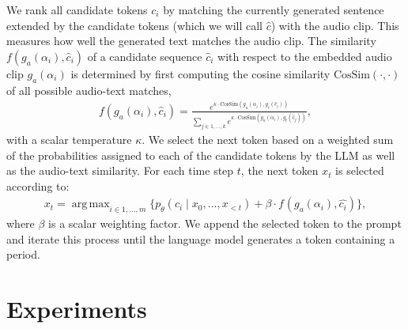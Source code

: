 \documentclass{article}
\DeclareMathOperator*{\argmax}{arg\,max}
\begin{document}
We rank all candidate tokens $c_i$ by matching the currently generated sentence extended by the candidate tokens (which we will call $\hat{c}$) with the audio clip. This measures how well the generated text matches the audio clip.
The similarity $f(g_a(\alpha_i),\hat{c}_i)$ of a candidate sequence $\hat{c}_i$ with respect to the embedded audio clip $g_a(\alpha_i)$ is determined by first computing the cosine similarity $\text{CosSim}(\cdot,\cdot)$ of all possible audio-text matches,
\begin{equation}
    \begin{split}
        f(g_a(\alpha_i),\hat{c}_i)
        =
        \frac{
        e^{\kappa \cdot \text{CosSim} \left(g_a(\alpha_i), g_t(\hat{c}_i) \right)}
        }{
        \sum_{j \in 1,\ldots,k}e^{\kappa \cdot \text{CosSim} \left(g_a(\alpha_i), g_t(\hat{c}_j)\right)}
        },
    \end{split}
\end{equation}
with a scalar temperature $\kappa$.
We select the next token based on a weighted sum of the probabilities assigned to each of the candidate tokens by the LLM as well as the audio-text similarity.
For each time step $t$, the next token $x_t$ is selected according to:
\begin{equation}\label{eq:next-token}
    \begin{split}
        x_t
        =
        \argmax_{i \in 1, \ldots, m}
        \Big\{
        p_{\theta} \left(c_i \mid x_0, \ldots, x_{<t} \right) +  \beta \cdot  f_{} \left(g_a(\alpha_i), \hat{c_i} \right)
        \Big\},
    \end{split}
\end{equation}
where $\beta$ is a scalar weighting factor.
We append the selected token to the prompt and iterate this process until the language model generates a token containing a period.




\section{Experiments}
\end{document}
